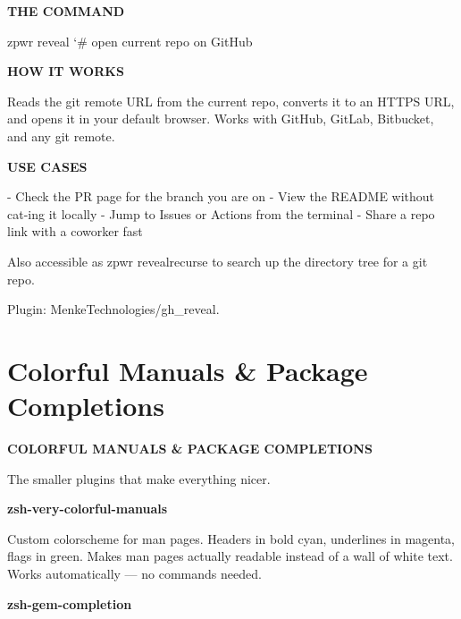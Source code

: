 \documentclass[11pt,a4paper,twoside]{book}
\begin{document}
\vspace{12pt}
{\bfseries\color{neonyellow} THE COMMAND}\vspace{4pt}

\begin{codebox}
\color{neongreen}zpwr reveal              {\char`\#} open current repo on GitHub\\
\end{codebox}


\vspace{12pt}
{\bfseries\color{neonyellow} HOW IT WORKS}\vspace{4pt}

Reads the git remote URL from the current repo, converts it to an HTTPS URL, and opens it in your default browser. Works with GitHub, GitLab, Bitbucket, and any git remote.


\vspace{12pt}
{\bfseries\color{neonyellow} USE CASES}\vspace{4pt}

- Check the PR page for the branch you are on - View the README without cat-ing it locally - Jump to Issues or Actions from the terminal - Share a repo link with a coworker fast

Also accessible as zpwr revealrecurse to search up the directory tree for a git repo.

Plugin: MenkeTechnologies/gh\_reveal.


\vspace{16pt}

\section{Colorful Manuals \& Package Completions}


\vspace{10pt}
{\large\bfseries\color{neoncyan} COLORFUL MANUALS \& PACKAGE COMPLETIONS}\vspace{6pt}

The smaller plugins that make everything nicer.


\vspace{12pt}
{\bfseries\color{neonyellow} zsh-very-colorful-manuals}\vspace{4pt}

Custom colorscheme for man pages. Headers in bold cyan, underlines in magenta, flags in green. Makes man pages actually readable instead of a wall of white text. Works automatically — no commands needed.


\vspace{12pt}
{\bfseries\color{neonyellow} zsh-gem-completion}\vspace{4pt}
\end{document}
